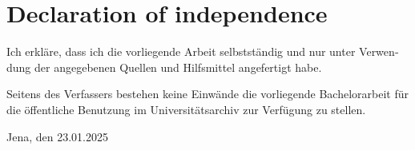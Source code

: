 \documentclass[a4paper, 12pt]{article}
\begin{document}
    
\newpage





\newpage

\thispagestyle{empty} 
\tableofcontents
\newpage

% 


% 

% 

% 

% 

% 

% 

% 

\clearpage

\printbibliography

\newpage
\thispagestyle{empty} 
\section*{Declaration of independence}
\begin{otherlanguage}{ngerman}
Ich erkläre, dass ich die vorliegende Arbeit selbstständig und nur unter Verwendung der
angegebenen Quellen und Hilfsmittel angefertigt habe.


Seitens des Verfassers bestehen keine Einwände die vorliegende Bachelorarbeit für die öffentliche Benutzung im
Universitätsarchiv zur Verfügung zu stellen.
\end{otherlanguage}

\vspace{30mm}

{\raggedleft 
Jena, den 23.01.2025 \\
}
\end{document}
